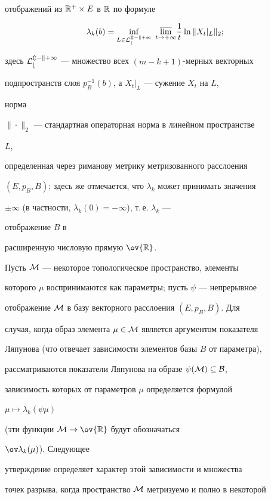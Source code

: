 отображений из $\Bbb R^+\times E$ в $\Bbb R$ по формуле 


$$ 


\lambda_k(b)=\inf_{L\in\cal L^{m-k+1}_b} \; 


\underset{t\to+\infty}{\varlimsup}\frac{1}{t}\ln\|X_t|_L\|_2; 


$$ 


здесь $\cal L^{m-k+1}_b$ --- множество всех $(m-k+1)$-мерных векторных 


подпространств слоя $p^{-1}_B(b)$, а $X_t|_L$ --- сужение $X_t$ на $L$, 


норма 


$\|\cdot\|_2$ --- стандартная операторная норма в линейном пространстве 


$L$, 


определенная через риманову метрику метризованного расслоения 


$(E,p_B,B)$; здесь же отмечается, что $\lambda_k$ может принимать значения 


$\pm\infty$ (в частности, $\lambda_k(0)=-\infty$), т.\,е. $\lambda_k$ --- 


отображение $B$ в 


расширенную числовую прямую $\ov{\Bbb R}$. 


 


Пусть $\cal M$ --- некоторое топологическое пространство, элементы 


которого $\mu$ воспринимаются как параметры; пусть $\psi$ --- непрерывное 


отображение $\cal M$ в базу векторного расслоения $(E,p_B,B)$. Для 


случая, когда образ элемента $\mu\in\cal M$ является аргументом показателя 


Ляпунова (что отвечает зависимости элементов базы $B$ от параметра), 


рассматриваются показатели Ляпунова на образе $\psi(\cal M)\subseteq B$, 


зависимость которых от параметров $\mu$ определяется формулой 


$\mu\mapsto\lambda_k(\psi\mu)$ 


(эти функции $\cal M\to\ov{\Bbb R}$ будут обозначаться 


$\ov\lambda_k(\mu)$). Следующее 


утверждение определяет характер этой зависимости и множества 


точек разрыва, когда пространство $\cal M$ метризуемо и полно в некоторой 


